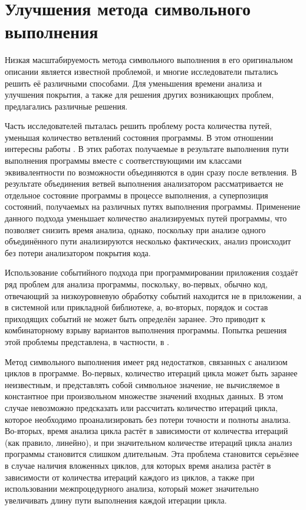 \section{Улучшения метода символьного выполнения}

Низкая масштабируемость метода символьного выполнения в его оригинальном описании является известной проблемой, и многие исследователи пытались решить её различными способами. Для уменьшения времени анализа и улучшения покрытия, а также для решения других возникающих проблем, предлагались различные решения.

Часть исследователей пыталась решить проблему роста количества путей, уменьшая количество ветвлений состояния программы. В этом отношении интересны работы \cite{state-merge, state-merge-securware}. В этих работах получаемые в результате выполнения пути выполнения программы вместе с соответствующими им классами эквивалентности по возможности объединяются в один сразу после ветвления. В результате объединения ветвей выполнения анализатором рассматривается не отдельное состояние программы в процессе выполнения, а суперпозиция состояний, получаемых на различных путях выполнения программы. Применение данного подхода уменьшает количество анализируемых путей программы, что позволяет снизить время анализа, однако, поскольку при анализе одного объединённого пути  анализируются несколько фактических, анализ происходит без потери анализатором покрытия кода. 

Использование событийного подхода при программировании приложения создаёт ряд проблем для анализа программы, поскольку, во-первых, обычно код, отвечающий за низкоуровневую обработку событий находится не в приложении, а в системной или прикладной библиотеке, а, во-вторых, порядок и состав приходящих событий не может быть определён заранее. Это приводит к комбинаторному взрыву вариантов выполнения программы. Попытка решения этой проблемы представлена, в частности, в \cite{anand-thesis}.

Метод символьного выполнения имеет ряд недостатков, связанных с анализом циклов в программе. Во-первых, количество итераций цикла может быть заранее неизвестным, и представлять собой символьное значение, не вычисляемое в константное при произвольном множестве значений входных данных. В этом случае невозможно предсказать или рассчитать количество итераций цикла, которое необходимо проанализировать без потери точности и полноты анализа. Во-вторых, время анализа цикла растёт в зависимости от количества итераций (как правило, линейно), и при значительном количестве итераций цикла анализ программы становится слишком длительным. Эта проблема становится серьёзнее в случае наличия вложенных циклов, для которых время анализа растёт в зависимости от количества итераций каждого из циклов, а также при использовании межпроцедурного анализа, который может значительно увеличивать длину пути выполнения каждой итерации цикла.

